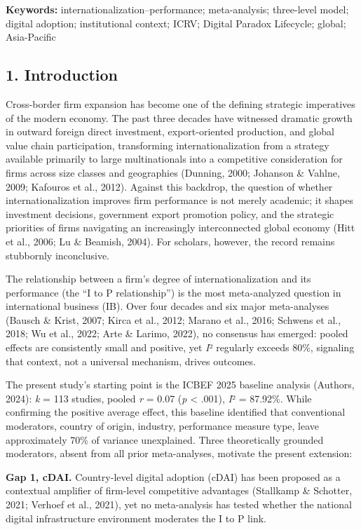 \documentclass[
  12pt,a4paper]{article}
\begin{document}
\textbf{Keywords:} internationalization--performance; meta-analysis;
three-level model; digital adoption; institutional context; ICRV;
Digital Paradox Lifecycle; global; Asia-Pacific

\hypertarget{introduction}{%
\subsection{1. Introduction}\label{introduction}}

Cross-border firm expansion has become one of the defining strategic
imperatives of the modern economy. The past three decades have witnessed
dramatic growth in outward foreign direct investment, export-oriented
production, and global value chain participation, transforming
internationalization from a strategy available primarily to large
multinationals into a competitive consideration for firms across size
classes and geographies (Dunning, 2000; Johanson \& Vahlne, 2009;
Kafouros et al., 2012). Against this backdrop, the question of whether
internationalization improves firm performance is not merely academic;
it shapes investment decisions, government export promotion policy, and
the strategic priorities of firms navigating an increasingly
interconnected global economy (Hitt et al., 2006; Lu \& Beamish, 2004).
For scholars, however, the record remains stubbornly inconclusive.

The relationship between a firm's degree of internationalization and its
performance (the ``I to P relationship'') is the most meta-analyzed
question in international business (IB). Over four decades and six major
meta-analyses (Bausch \& Krist, 2007; Kirca et al., 2012; Marano et al.,
2016; Schwens et al., 2018; Wu et al., 2022; Arte \& Larimo, 2022), no
consensus has emerged: pooled effects are consistently small and
positive, yet \emph{I}² regularly exceeds 80\%, signaling that context,
not a universal mechanism, drives outcomes.

The present study's starting point is the ICBEF 2025 baseline analysis
(Authors, 2024): \emph{k} = 113 studies, pooled \emph{r} = 0.07
(\emph{p} \textless{} .001), \emph{I}² = 87.92\%. While confirming the
positive average effect, this baseline identified that conventional
moderators, country of origin, industry, performance measure type, leave
approximately 70\% of variance unexplained. Three theoretically grounded
moderators, absent from all prior meta-analyses, motivate the present
extension:

\textbf{Gap 1, cDAI.} Country-level digital adoption (cDAI) has been
proposed as a contextual amplifier of firm-level competitive advantages
(Stallkamp \& Schotter, 2021; Verhoef et al., 2021), yet no
meta-analysis has tested whether the national digital infrastructure
environment moderates the I to P link.
\end{document}
